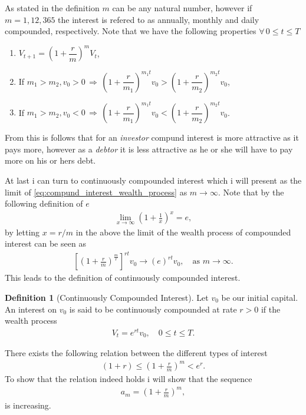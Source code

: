\documentclass{article}
\theoremstyle{definition}
\newtheorem{definition}[theorem]{Definition}
\numberwithin{equation}{section}
\begin{document}
As stated in the definition $m$ can be any natural number, however if $m = 1, 12, 365$ the interest is refered to as annually, monthly and daily compounded, respectively.
Note that we have the following properties $\forall\, 0 \leq t \leq T$
\begin{enumerate}[label = \textit{\roman*})]
    \item $V_{t + 1} = \left( 1 + \dfrac{r}{m} \right)^{m}V_t$,
    \item If $m_1 > m_2, v_0 > 0 
    \, \Rightarrow \, 
    \left( 1 + \dfrac{r}{m_1} \right)^{m_1t}v_0
    >
    \left( 1 + \dfrac{r}{m_2} \right)^{m_2t}v_0$,
    \item If $m_1 > m_2, v_0 < 0 
    \, \Rightarrow \, 
    \left( 1 + \dfrac{r}{m_1} \right)^{m_1t}v_0
    <
    \left( 1 + \dfrac{r}{m_2} \right)^{m_2t}v_0$.
\end{enumerate}
From this is follows that for an \textit{investor} compund interest is more attractive as it pays more, however as a \textit{debtor} it is less attractive as he or she will have to pay more on his or hers debt.

At last i can turn to continuously compounded interest which i will present as the limit of \eqref{eq:compund_interest_wealth_process} as $m \rightarrow \infty$.
Note that by the following definition of $e$
\begin{align}
    \lim_{x \rightarrow \infty} \left(1 + \frac{1}{x}\right)^x = e,
\end{align}
by letting $x = r/m$ in the above the limit of the wealth process of compounded interest can be seen as
\begin{align}
    \left[\left( 1 + \frac{r}{m} \right)^\frac{m}{r}\right]^{rt}v_0 \rightarrow
    (e)^{rt}v_0, \quad \text{as } m \rightarrow \infty.
\end{align} 
This leads to the definition of continuously compounded interest.
\begin{definition}[Continuously Compounded Interest]
    Let $v_0$ be our initial capital.
    An interest on $v_0$ is said to be continuously compounded at rate $r>0$ if the wealth process
    \begin{align}
        V_t = e^{rt}v_0, \quad 0 \leq t \leq T.
    \end{align}
\end{definition}
There exists the following relation between the different types of interest
\begin{align}
    (1 + r) \leq \left(1 + \frac{r}{m}\right)^m < e^r.
\end{align}
To show that the relation indeed holds i will show that the sequence
\begin{align}
    a_m = \left(1 + \frac{r}{m}\right)^m,
\end{align}
is increasing.
\end{document}
